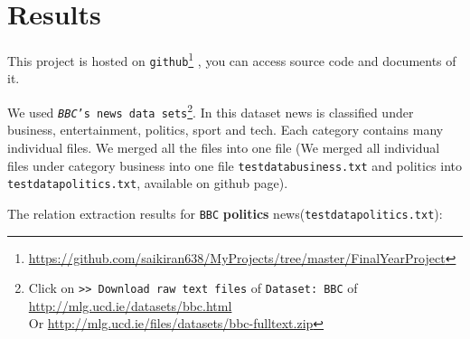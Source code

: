 \documentclass[12pt]{report}
\begin{document}
\section{Results}
\par This project is hosted on \texttt{github}\footnote{\url{https://github.com/saikiran638/MyProjects/tree/master/FinalYearProject}}
, you can access source code and documents of it.
\par We used \texttt{\textit{BBC}'s news data sets}\footnote{Click on \texttt{>> Download raw text files} of \texttt{Dataset: BBC} of \url{http://mlg.ucd.ie/datasets/bbc.html}\\Or \url{http://mlg.ucd.ie/files/datasets/bbc-fulltext.zip}}.
In this dataset news is classified under business, entertainment, politics, sport and tech.
Each category contains many individual files. We merged all the files into
 one file (We merged all individual files under category business into one file \texttt{testdatabusiness.txt} and politics into \texttt{testdatapolitics.txt}, available on github page).
\par The relation extraction results for \texttt{BBC} \textbf{politics} news(\texttt{testdatapolitics.txt}):
\end{document}
